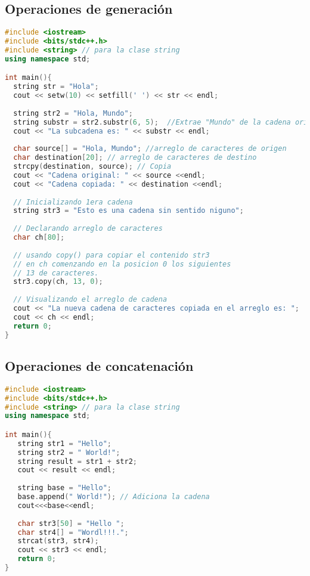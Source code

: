 \subsection{Operaciones de generación}
\begin{lstlisting}[language=C++]
#include <iostream>
#include <bits/stdc++.h>
#include <string> // para la clase string
using namespace std;

int main(){
  string str = "Hola";
  cout << setw(10) << setfill(' ') << str << endl;
	
  string str2 = "Hola, Mundo";
  string substr = str2.substr(6, 5);  //Extrae "Mundo" de la cadena original
  cout << "La subcadena es: " << substr << endl;
	
  char source[] = "Hola, Mundo"; //arreglo de caracteres de origen
  char destination[20]; // arreglo de caracteres de destino
  strcpy(destination, source); // Copia
  cout << "Cadena original: " << source <<endl;
  cout << "Cadena copiada: " << destination <<endl;
	
  // Inicializando 1era cadena
  string str3 = "Esto es una cadena sin sentido niguno";
	
  // Declarando arreglo de caracteres
  char ch[80];
	
  // usando copy() para copiar el contenido str3
  // en ch comenzando en la posicion 0 los siguientes
  // 13 de caracteres.
  str3.copy(ch, 13, 0);
	
  // Visualizando el arreglo de cadena
  cout << "La nueva cadena de caracteres copiada en el arreglo es: ";
  cout << ch << endl;
  return 0;
}
\end{lstlisting}
\subsection{Operaciones de concatenación}
\begin{lstlisting}[language=C++]
#include <iostream>
#include <bits/stdc++.h>
#include <string> // para la clase string
using namespace std;

int main(){
   string str1 = "Hello";
   string str2 = " World!";
   string result = str1 + str2;
   cout << result << endl;
   
   string base = "Hello";
   base.append(" World!"); // Adiciona la cadena
   cout<<<base<<endl;
	
   char str3[50] = "Hello ";
   char str4[] = "Wordl!!!.";
   strcat(str3, str4);
   cout << str3 << endl;
   return 0;
}
\end{lstlisting}
